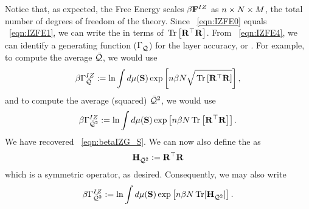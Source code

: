 Notice that, as expected, the Free Energy scales $\beta\mathbf{F}^{IZ}$ as $n \times N \times M$, the total number of degrees of freedom of the theory.
\noindent
Since \EQN~\ref{eqn:IZFE0} equals \EQN~\ref{eqn:IZFE1}, we can write the \FreeEnergy in terms of $\mbox{}\operatorname{Tr}\left[\mathbf{R}^{\top}\mathbf{R}\right]$. From \EQN~\ref{eqn:IZFE4}, 
we can identify a generating function ($\Gamma_{\bar{\mathcal{Q}}}$) for the layer accuracy, or \Quality.
For example, to compute the average \Quality $\bar{\mathcal{Q}}$, we would use
\begin{align}
  \label{eqn:IZG_Q}
  \beta\Gamma^{IZ}_{\bar{\mathcal{Q}}} :=  \ln \int d\mu(\mathbf{S}) \exp\left[n\beta N\sqrt{\mbox{}\operatorname{Tr}\left[\mathbf{R}^{\top}\mathbf{R}\right]}\right],
\end{align}
and to compute the average \Quality (squared) $\bar{\mathcal{Q}}^{2}$, we would use
\begin{align}
    \label{eqn:IZG_QT2}
  \beta\Gamma^{IZ}_{\bar{\mathcal{Q}}^{2}} :=  \ln \int d\mu(\mathbf{S}) \exp\left[n\beta N\mbox{}\operatorname{Tr}\left[\mathbf{R}^{\top}\mathbf{R}\right]\right] .
\end{align}
We have recovered \EQN~\ref{eqn:betaIZG_S}.
We can now also define the \LayerQualitySquared \Hamiltonian as
\begin{equation}
      \label{eqn:HBARE}
  \mathbf{H}_{\bar{\mathcal{Q}}^{2}}:=\mathbf{R}^{\top}\mathbf{R}
\end{equation}
which is a symmetric operator, as desired.
Consequently, we may also write
\begin{align}
    \label{eqn:IZG_QT3}
  \beta\Gamma^{IZ}_{\bar{\mathcal{Q}}^{2}} :=  \ln \int d\mu(\mathbf{S}) \exp\left[n\beta N \operatorname{Tr}[\mathbf{H}_{\bar{\mathcal{Q}}^{2}}]\right]  .
\end{align}


